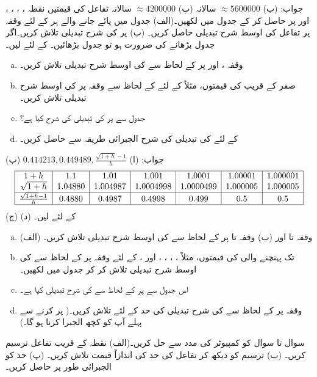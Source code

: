 جواب: (ب)
$\approx 5600000$ 
سالانہ
(پ)
$\approx 4200000$
سالانہ
تفاعل  کی قیمتیں نقطہ ، ، ، ،  اور  پر  حاصل کر کے جدول میں لکھیں۔(الف) جدول میں پائے جانے والے ہر  کے لئے وقفہ  پر تفاعل کی اوسط شرح تبدیلی حاصل کریں۔ (ب)  پر  کی شرح تبدیلی تلاش کریں۔اگر جدول بڑھانے کی ضرورت ہو تو جدول بڑھائیں۔ 
 کے لئے  لیں۔
\begin{enumerate}[a.]
\item
وقفہ ،  اور  پر  کے  لحاظ سے  کی اوسط شرح تبدیلی تلاش کریں۔
\item
صفر کے قریب  کی قیمتوں، مثلاً  کے لئے  کے لحاظ سے وقفہ  پر  کی اوسط شرح تبدیلی تلاش کریں۔
\item
جدول سے  پر  کی تبدیلی کی شرح کیا ہے؟
\item
{} کے لئے  کی تبدیلی کی شرح الجبرائی طریقہ سے حاصل کریں۔
\end{enumerate}
جواب: (ا)
$0.414213,0.449489,\tfrac{\sqrt{1+h}-1}{h}$
(ب) 
\begin{align*}
\begin{array}{|c|c|c|c|c|c|c|}
\hline
1+h&1.1&1.01&1.001&1.0001&1.00001&1.000001\\
\sqrt{1+h}&1.04880&1.004987&1.0004998&1.0000499&1.000005&1.000005\\
\hline
\tfrac{\sqrt{1+h}-1}{h}&0.4880&0.4987&0.4998&0.499&0.5&0.5\\
\hline
\end{array}
\end{align*}
(ج)  (د) 
 کے لئے  لیں۔
\begin{enumerate}[a.]
\item
(الف) وقفہ  تا  اور  (ب) وقفہ  تا  پر  کے لحاظ سے  کی اوسط شرح تبدیلی تلاش کریں۔ 
\item
{} تک پہنچنے والی  کی قیمتوں، مثلاً ، ، ، ،  اور ، کے لئے وقفہ  پر  کے لحاظ سے  کی اوسط شرح تبدیلی تلاش کر کر جدول میں لکھیں۔
\item
اس جدول سے  پر  کے لحاظ سے  کی شرح تبدیلی کیا ہے۔
\item
وقفہ  پر  کے لحاظ سے  کی شرح تبدیلی کی حد  کے لئے  تلاش کریں۔( پر کرنے سے پہلے آپ کو کچھ الجبرا کرنا ہو گا۔)
\end{enumerate}
سوال  تا سوال  کو کمپیوٹر کی مدد سے حل کریں۔(الف) نقطہ  کے قریب تفاعل ترسیم کریں۔ (ب) ترسیم کو دیکھ کر تفاعل کی حد کی اندازاً قیمت تلاش کریں۔ (پ) حد کو الجبرائی طور پر حاصل کریں۔

